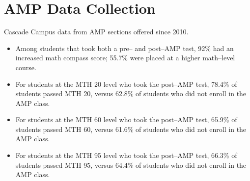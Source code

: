 \chapter{AMP Data Collection}
\label{app:sec:ampdata}

Cascade Campus data from AMP sections offered since 2010.
\begin{itemize}
\item Among students that took both a pre-- and post--AMP test, 92\% had an increased math compass score; 55.7\% were placed at a higher math--level course.
\item For students at the MTH 20 level who took the post--AMP test, 78.4\% of students passed MTH 20, versus 62.8\% of students who did not enroll in the AMP class.
\item For students at the MTH 60 level who took the post--AMP test, 65.9\% of students passed MTH 60, versus 61.6\% of students who did not enroll in the AMP class.
\item For students at the MTH 95 level who took the post--AMP test, 66.3\% of students passed MTH 95, versus 64.4\% of students who did not enroll in the AMP class.
\end{itemize}
